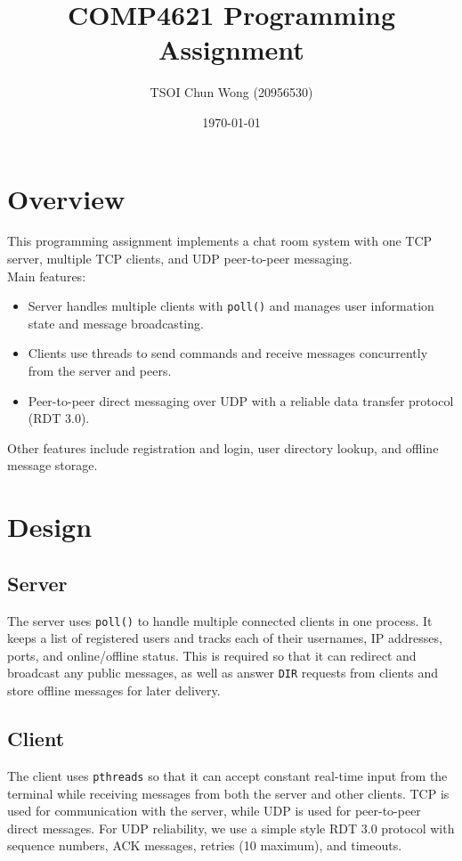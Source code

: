 \documentclass[11pt]{article}
\title{COMP4621 Programming Assignment}
\date{\today}
\author{TSOI Chun Wong (20956530)}
\begin{document}
\maketitle

\section{Overview}

This programming assignment implements a chat room system with 
one TCP server, multiple TCP clients, and UDP peer-to-peer messaging. \\

Main features: 
\begin{itemize}
    \item Server handles multiple clients with \texttt{poll()} and manages user information state and message broadcasting.
    \item Clients use threads to send commands and receive messages concurrently from the server and peers.
    \item Peer-to-peer direct messaging over UDP with a reliable data transfer protocol (RDT 3.0).
\end{itemize}

Other features include registration and login, user directory lookup, and offline message storage.

\section{Design}

\subsection{Server}

The server uses \texttt{poll()} to handle multiple connected clients in one process. 
It keeps a list of registered users and tracks each of their usernames, 
IP addresses, ports, and online/offline status. 
This is required so that it can redirect and broadcast any public messages, 
as well as answer \texttt{DIR} requests from clients and store offline messages for later delivery.

\subsection{Client}
The client uses \texttt{pthreads} so that it can accept constant real-time input from the terminal 
while receiving messages from both the server and other clients. 
TCP is used for communication with the server, while UDP is used for peer-to-peer direct messages. 
For UDP reliability, we use a simple style RDT 3.0 protocol with sequence numbers, 
ACK messages, retries (10 maximum), and timeouts.
\end{document}
